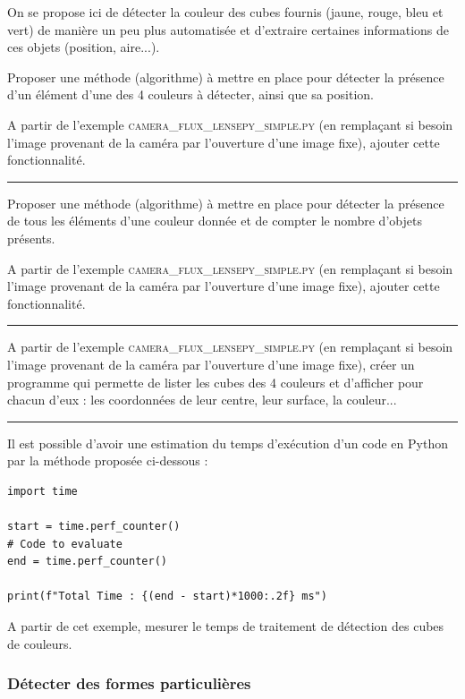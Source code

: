 \documentclass[a4paper,11pt,titlepage]{article} %
\begin{document}
On se propose ici de détecter la couleur des cubes fournis (jaune, rouge, bleu et vert) de manière un peu plus automatisée et d'extraire certaines informations de ces objets (position, aire...).

\Quest Proposer une méthode (algorithme) à mettre en place pour détecter la présence d'un élément d'une des 4 couleurs à détecter, ainsi que sa position.

\Manip A partir de l'exemple \textsc{camera\_flux\_lensepy\_simple.py} (en remplaçant si besoin l'image provenant de la caméra par l'ouverture d'une image fixe), ajouter cette fonctionnalité.

\noindent \rule{\linewidth}{1pt}

\Quest Proposer une méthode (algorithme) à mettre en place pour détecter la présence de tous les éléments d'une couleur donnée et de compter le nombre d'objets présents.

\Manip A partir de l'exemple \textsc{camera\_flux\_lensepy\_simple.py} (en remplaçant si besoin l'image provenant de la caméra par l'ouverture d'une image fixe), ajouter cette fonctionnalité.

\noindent \rule{\linewidth}{1pt}

\Manip A partir de l'exemple \textsc{camera\_flux\_lensepy\_simple.py} (en remplaçant si besoin l'image provenant de la caméra par l'ouverture d'une image fixe), créer un programme qui permette de lister les cubes des 4 couleurs et d'afficher pour chacun d'eux : les coordonnées de leur centre, leur surface, la couleur...

\noindent \rule{\linewidth}{1pt}

Il est possible d'avoir une estimation du temps d'exécution d'un code en Python par la méthode proposée ci-dessous :

\begin{lstlisting}
import time

start = time.perf_counter()
# Code to evaluate
end = time.perf_counter()

print(f"Total Time : {(end - start)*1000:.2f} ms")
\end{lstlisting}

\Manip A partir de cet exemple, mesurer le temps de traitement de détection des cubes de couleurs.

\subsubsection{Détecter des formes particulières}
\end{document}
